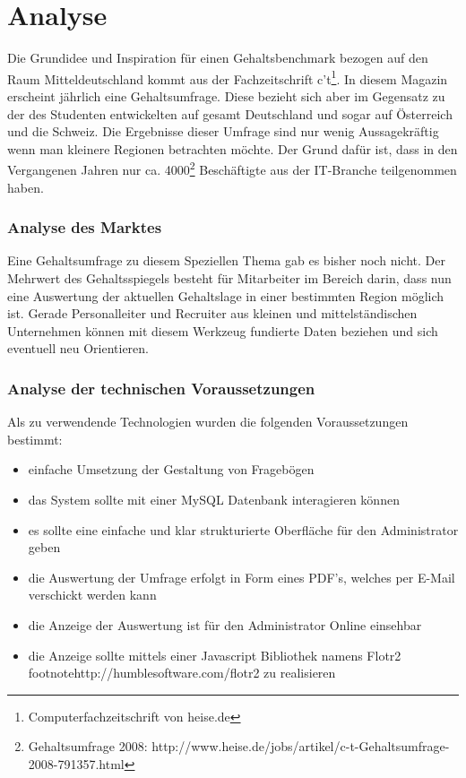 \part{Analyse}
Die Grundidee und Inspiration für einen Gehaltsbenchmark bezogen auf den Raum Mitteldeutschland kommt aus der Fachzeitschrift c't\footnote{Computerfachzeitschrift von heise.de}. 
In diesem Magazin erscheint jährlich eine Gehaltsumfrage. Diese bezieht sich aber im Gegensatz zu der des Studenten entwickelten auf gesamt Deutschland und sogar auf Österreich und die Schweiz.
Die Ergebnisse dieser Umfrage sind nur wenig Aussagekräftig wenn man kleinere Regionen betrachten möchte. 
Der Grund dafür ist, dass in den Vergangenen Jahren nur ca. 4000\footnote{Gehaltsumfrage 2008: http://www.heise.de/jobs/artikel/c-t-Gehaltsumfrage-2008-791357.html} Beschäftigte aus der IT-Branche teilgenommen haben.
\section{Analyse des Marktes}
Eine Gehaltsumfrage zu diesem Speziellen Thema gab es bisher noch nicht. 
Der Mehrwert des Gehaltsspiegels besteht für Mitarbeiter im Bereich  darin, 
dass nun eine Auswertung der aktuellen Gehaltslage in einer bestimmten Region möglich ist. 
Gerade Personalleiter und Recruiter aus kleinen und mittelständischen Unternehmen können mit diesem Werkzeug fundierte Daten beziehen und sich eventuell neu Orientieren. 
\section{Analyse der technischen Voraussetzungen}
Als zu verwendende Technologien wurden die folgenden Voraussetzungen bestimmt:
\begin{itemize}
 \item einfache Umsetzung der Gestaltung von Fragebögen
 \item das System sollte mit einer MySQL Datenbank interagieren können
 \item es sollte eine einfache und klar strukturierte Oberfläche für den Administrator geben
 \item die Auswertung der Umfrage erfolgt in Form eines PDF's, welches per E-Mail verschickt werden kann
 \item die Anzeige der Auswertung ist für den Administrator Online einsehbar
 \item die Anzeige sollte mittels einer Javascript Bibliothek namens Flotr2\\footnote{http://humblesoftware.com/flotr2} zu realisieren
\end{itemize}
